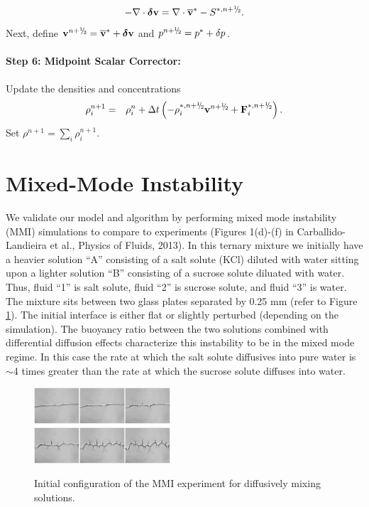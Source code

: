 \documentclass[final]{siamltex}
\newcommand{\sfrac}[2]{\mathchoice
  {\kern0em\raise.5ex\hbox{\the\scriptfont0 #1}\kern-.15em/
   \kern-.15em\lower.25ex\hbox{\the\scriptfont0 #2}}
  {\kern0em\raise.5ex\hbox{\the\scriptfont0 #1}\kern-.15em/
   \kern-.15em\lower.25ex\hbox{\the\scriptfont0 #2}}
  {\kern0em\raise.5ex\hbox{\the\scriptscriptfont0 #1}\kern-.2em/
   \kern-.15em\lower.25ex\hbox{\the\scriptscriptfont0 #2}}
  {#1\!/#2}}
\def\Fb {{\bf F}}
\def\vb {{\bf v}}
\def\deltab {\boldsymbol{\delta}}
\def\myhalf {\sfrac{1}{2}}
\begin{document}
\begin{equation}
-\nabla\cdot\deltab\vb = \nabla\cdot\overline\vb^* - S^{*,n+\myhalf}.
\end{equation}
Next, define $\vb^{n+\myhalf} = \overline\vb^* + \deltab\vb$ and $p^{n+\myhalf} = p^* + \delta p$.\\ \\
{\bf Step 6: Midpoint Scalar Corrector:}\\ \\
Update the densities and concentrations
\begin{eqnarray}
\rho_i^{n+1} &=& \rho_i^n + \Delta t\left(-\rho_i^{*,n+\myhalf}\vb^{n+\myhalf} + \Fb_i^{*,n+\myhalf}\right).
\end{eqnarray}
Set $\rho^{n+1} = \sum_i\rho_i^{n+1}$.

\clearpage

\section{Mixed-Mode Instability}
We validate our model and algorithm by performing mixed mode instability (MMI) simulations to compare to experiments 
(Figures 1(d)-(f) in Carballido-Landieira et al., Physics of Fluids, 2013).  In this ternary mixture
we initially have a heavier solution ``A'' consisting of a salt solute (KCl) diluted with water sitting upon
a lighter solution ``B'' consisting of a sucrose solute diluated with water.  
Thus, fluid ``1'' is salt solute, fluid ``2'' is sucrose solute, and fluid ``3'' is water.
The mixture sits between two glass plates separated by 0.25 mm (refer to Figure \ref{fig:mmi}).
The initial interface is either flat or slightly perturbed (depending
on the simulation).  The buoyancy ratio between the two solutions combined with 
differential diffusion effects characterize this instability to be in the mixed mode
regime.  In this case the rate at which the salt solute diffusives into pure water is $\sim$4 times greater 
than the rate at which the sucrose solute diffuses into water.
\begin{figure}[hb]
\centering
\includegraphics[width=2in]{mmi}
\label{fig:mmi}
\caption{Initial configuration of the MMI experiment for diffusively mixing solutions.}
\end{figure}
\end{document}
